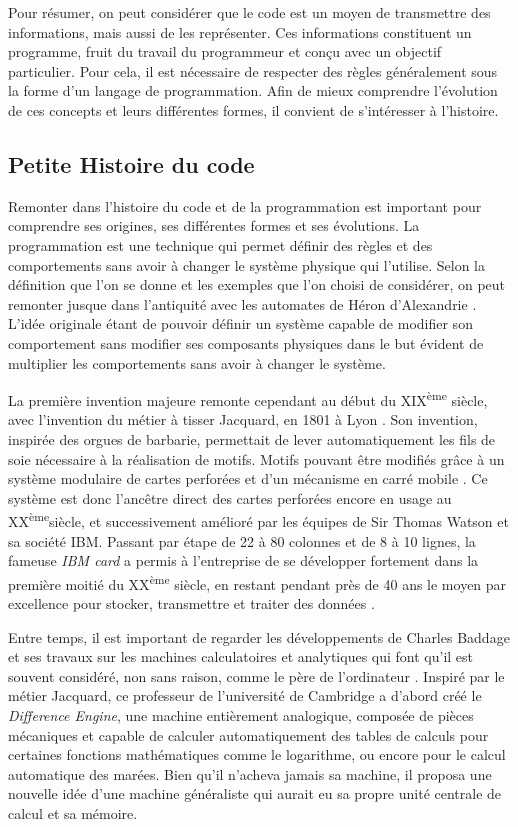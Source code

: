 \documentclass[12pt]{article} %
\newcommand{\ts}{\textsuperscript} %
\begin{document}
Pour résumer, on peut considérer que le code est un moyen de transmettre des informations, mais aussi de les représenter. Ces informations constituent un programme, fruit du travail du programmeur et conçu avec un objectif particulier. Pour cela, il est nécessaire de respecter des règles généralement sous la forme d'un langage de programmation. Afin de mieux comprendre l'évolution de ces concepts et leurs différentes formes, il convient de s'intéresser à l'histoire.

\subsection{Petite Histoire du code}
Remonter dans l'histoire du code et de la programmation est important pour comprendre ses origines, ses différentes formes et ses évolutions. La programmation est une technique qui permet définir des règles et des comportements sans avoir à changer le système physique qui l'utilise. Selon la définition que l'on se donne et les exemples que l'on choisi de considérer, on peut remonter jusque dans l'antiquité avec les automates de Héron d'Alexandrie \cite{View_all_of_Hansels_posts2018-uw}. L'idée originale étant de pouvoir définir un système capable de modifier son comportement sans modifier ses composants physiques dans le but évident de multiplier les comportements sans avoir à changer le système.

La première invention majeure remonte cependant au début du XIX\ts{ème} siècle, avec l'invention du métier à tisser Jacquard, en 1801 à Lyon \cite{RDigest1982}. Son invention, inspirée des orgues de barbarie, permettait de lever automatiquement les fils de soie nécessaire à la réalisation de motifs. Motifs pouvant être modifiés grâce à un système modulaire de cartes perforées et d'un mécanisme en carré mobile \cite{noauthor_2009-bf}. Ce système est donc l'ancêtre direct des cartes perforées encore en usage au XX\ts{ème}siècle, et successivement amélioré par les équipes de Sir Thomas Watson et sa société IBM. Passant par étape de 22 à 80 colonnes et de 8 à 10 lignes, la fameuse \textit{IBM card} a permis à l'entreprise de se développer fortement dans la première moitié du XX\ts{ème} siècle, en restant pendant près de 40 ans le moyen par excellence pour stocker, transmettre et traiter des données \cite{noauthor_2012-xq}.

Entre temps, il est important de regarder les développements de Charles Baddage et ses travaux sur les machines calculatoires et analytiques qui font qu'il est souvent considéré, non sans raison, comme le père de l'ordinateur \cite{Copeland2020-my}. Inspiré par le métier Jacquard, ce professeur de l'université de Cambridge a d'abord créé le \textit{Difference Engine}, une machine entièrement analogique, composée de pièces mécaniques et capable de calculer automatiquement des tables de calculs pour certaines fonctions mathématiques comme le logarithme, ou encore pour le calcul automatique des marées. Bien qu'il n'acheva jamais sa machine, il proposa une nouvelle idée d'une machine généraliste qui aurait eu sa propre unité centrale de calcul et sa mémoire. 
\end{document}
